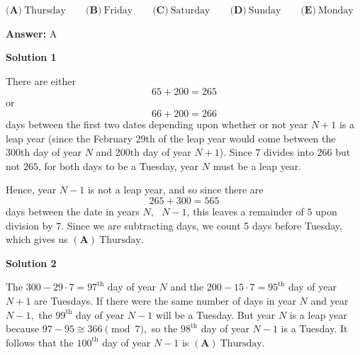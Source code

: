 \begin{enumerate}
 $\textbf{(A)}\ \text{Thursday} \qquad\textbf{(B)}\ \text{Friday} \qquad\textbf{(C)}\ \text{Saturday} \qquad\textbf{(D)}\ \text{Sunday} \qquad\textbf{(E)}\ \text{Monday}$

 \textbf{Answer: }A



\textbf{Solution 1}

There are either 
 \[65 + 200 = 265\] or 
 \[66 + 200 = 266\] days between the first two dates depending upon whether or not year $N+1$ is a leap year (since the February 29th of the leap year would come between the 300th day of year $N$ and 200th day of year $N + 1$). Since $7$ divides into $266$ but not $265$, for both days to be a Tuesday, year $N$ must be a leap year.

 Hence, year $N-1$ is not a leap year, and so since there are 
 \[265 + 300 = 565\] days between the date in years $N,\text{ }N-1$, this leaves a remainder of $5$ upon division by $7$. Since we are subtracting days, we count 5 days before Tuesday, which gives us  $\boxed{\mathbf{(A)} \ \text{Thursday}.}$




\textbf{Solution 2}

The $300-29\cdot 7=97^{\text{th}}$ day of year $N$ and the $200-15\cdot 7=95^{\text{th}}$ day of year $N+1$ are Tuesdays. If there were the same number of days in year $N$ and year $N-1,$ the $99^{\text{th}}$ day of year $N-1$ will be a Tuesday. But year $N$ is a leap year because $97-95 \cong 366 \pmod{7},$ so the $98^{\text{th}}$ day of year $N-1$ is a Tuesday. It follows that the $100^{\text{th}}$ day of year $N-1$ is $\boxed{\mathbf{(A)} \ \text{Thursday}.}$



\end{enumerate}